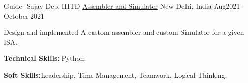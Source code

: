 \begin{cventries}
  \cventry
    {Guide- Sujay Deb, IIITD} %
    {\href{https://github.com/shaknoah/ASSEMBLER-AND-SIMULATOR}{Assembler and Simulator}} %
    {New Delhi, India} %
    {Aug2021 - October 2021} %
    {
      \begin{cvitems} %
        \item {Design and implemented A custom assembler and custom
Simulator for a given ISA.}
        \item {\textbf{Technical Skills:} Python.}
        \item {\textbf{Soft Skills:}Leadership, Time Management, Teamwork, Logical Thinking.}
      \end{cvitems}
    }

\end{cventries}

